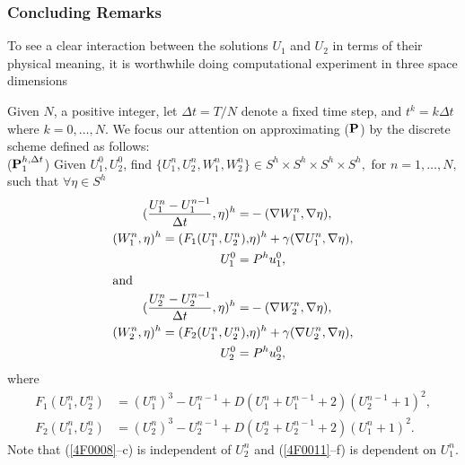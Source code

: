 \subsubsection{Concluding Remarks}
To see a clear interaction between the solutions $U_1$ and $U_2$ in
terms of their physical meaning, it is worthwhile doing computational
experiment in three space dimensions


Given $N$, a positive integer, let $\Delta t= T/N$ denote a fixed time step,
and $t^k=k\Delta t$ where $k=0,\dots ,N.$  We focus
our attention on approximating ($\mbox{\boldmath$\rm P$}$) by the discrete scheme
defined as follows:\\
($\mbox{\boldmath$\rm P$}^{h,\Delta t}_1$) \quad Given $U_1^0, U_2^0$, find
$\{U_1^n, U_2^n, W_1^n, W_2^n\} \in S^h\times S^h\times S^h\times S^h,$ for  $n=1,\dots, N,$ such that
$\forall \eta \in S^h $
\eqlabon 
\begin{align} 
(\frac{U^n_{1}-U_1^{n-1}}{\Delta t} ,\eta)^h  = &- (\nabla W^n_{1} ,\nabla \eta  ),\label{4F0008}\\
(W^n_{1},\eta)^h  =(F_1(U_1^n,U_2^n), & \eta)^h+\gamma
(\nabla U^n_{1} ,\nabla \eta),\label{4F0009}\\
U^0_1=&\; P^h u_{1}^{0},\label{4F0010}\\
\intertext{and}
(\frac{U^n_{2}-U_2^{n-1}}{\Delta t},\eta)^h  = &- (\nabla W^n_{2} ,\nabla \eta ),\label{4F0011}\\
(W^n_{2},\eta)^h  =(F_2(U_1^n,U_2^n), & \eta)^h+\gamma(\nabla U^n_{2} ,\nabla \eta ),\label{4F0012}\\
U^0_2 = & \; P^h u_{2}^{0},\label{4F0013}
\end{align}
where
\begin{align}
F_1(U_1^n,U_2^n) & = ({U^n_1})^3- U^{n-1}_1  +
D(U^{n}_1+U^{n-1}_1+2)(U^{n-1}_2+1)^2,\label{4F0014}\\
F_2(U_1^n,U_2^n) & = ({U^n_2})^3- U^{n-1}_2 + 
D(U^{n}_2+U^{n-1}_2+2)(U^{n}_1+1)^2.\label{4F0015}
\end{align}
Note that (\ref{4F0008}--c) is independent of $U^n_2$ and
(\ref{4F0011}--f) is dependent on $U^n_1.$

\setcounter{equation}{0}
